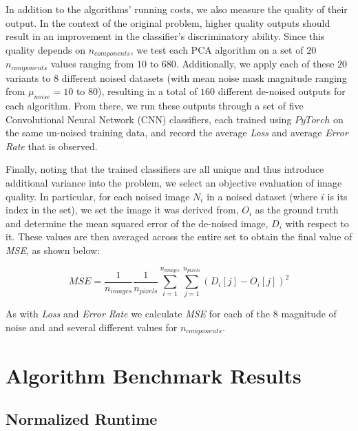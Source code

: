 \documentclass[12pt]{article}
\begin{document}
    In addition to the algorithms' running costs, we also measure the quality of their output. In the context of the original problem, higher quality outputs should result in an improvement in the classifier's discriminatory ability. Since this quality depends on $n_{components}$, we test each PCA algorithm on a set of $20$ $n_{components}$ values ranging from $10$ to $680$. Additionally, we apply each of these $20$ variants to $8$ different noised datasets (with mean noise mask magnitude ranging from $\mu_{noise} = 10$ to $80$), resulting in a total of $160$ different de-noised outputs for each algorithm. From there, we run these outputs through a set of five Convolutional Neural Network (CNN) classifiers, each trained using $PyTorch$ on the same un-noised training data, and record the average \textit{Loss} and average \textit{Error Rate} that is observed. 
    
    Finally, noting that the trained classifiers are all unique and thus introduce additional variance into the problem, we select an objective evaluation of image quality. In particular, for each noised image $N_i$ in a noised dataset (where $i$ is its index in the set), we set the image it was derived from, $O_i$ as the ground truth and determine the mean squared error of the de-noised image, $D_i$ with respect to it. These values are then averaged across the entire set to obtain the final value of \textit{MSE}, as shown below:
    
    $$ \textit{MSE} = \frac{1}{n_{images}}\frac{1}{n_{pixels}}\sum_{i=1}^{n_{images}}\sum_{j=1}^{n_{pixels}}(D_i[j] - O_i[j])^2$$
    
    As with \textit{Loss} and \textit{Error Rate} we calculate \textit{MSE} for each of the $8$ magnitude of noise and and several different values for $n_{components}$.
   

\section{Algorithm Benchmark Results}\label{5}

\subsection{Normalized Runtime}\label{5.1}
\end{document}
